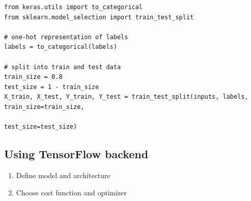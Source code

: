 \documentclass[%
oneside,                 %
final,                   %
10pt]{article}
\begin{document}
\begin{verbatim}
from keras.utils import to_categorical
from sklearn.model_selection import train_test_split

# one-hot representation of labels
labels = to_categorical(labels)

# split into train and test data
train_size = 0.8
test_size = 1 - train_size
X_train, X_test, Y_train, Y_test = train_test_split(inputs, labels, train_size=train_size,
                                                    test_size=test_size)
\end{verbatim}

\subsection*{Using TensorFlow backend}

\begin{enumerate}
\item Define model and architecture

\item Choose cost function and optimizer
\end{enumerate}
\end{document}
